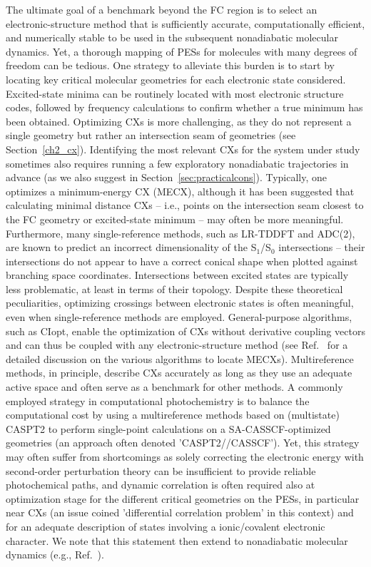 \documentclass[9pt,bestpractices,pubversion]{livecoms}
\begin{document}
The ultimate goal of a benchmark beyond the FC region is to select an electronic-structure method that is sufficiently accurate, computationally efficient, and numerically stable to be used in the subsequent nonadiabatic molecular dynamics. Yet, a thorough mapping of PESs for molecules with many degrees of freedom can be tedious. One strategy to alleviate this burden is to start by locating key critical molecular geometries for each electronic state considered. Excited-state minima can be routinely located with most electronic structure codes, followed by frequency calculations to confirm whether a true minimum has been obtained. Optimizing CXs is more challenging, as they do not represent a single geometry but rather an intersection seam of geometries (see Section~\ref{ch2_cx}).\cite{pieri2021namdreactor} Identifying the most relevant CXs for the system under study sometimes also requires running a few exploratory nonadiabatic trajectories in advance (as we also suggest in Section~\ref{sec:practicalcons}). Typically, one optimizes a minimum-energy CX (MECX), although it has been suggested that calculating minimal distance CXs -- i.e., points on the intersection seam closest to the FC geometry or excited-state minimum -- may often be more meaningful.\cite{levine2008optimizing} Furthermore, many single-reference methods, such as LR-TDDFT and ADC(2), are known to predict an incorrect dimensionality of the S$_1$/S$_0$ intersections -- their intersections do not appear to have a correct conical shape when plotted against branching space coordinates.\cite{tuna2015assessment,taylor2023description} Intersections between excited states are typically less problematic, at least in terms of their topology. Despite these theoretical peculiarities, optimizing crossings between electronic states is often meaningful, even when single-reference methods are employed.\cite{taylor2023description} General-purpose algorithms, such as CIopt,\cite{levine2008optimizing} enable the optimization of CXs without derivative coupling vectors and can thus be coupled with any electronic-structure method (see Ref.~ for a detailed discussion on the various algorithms to locate MECXs). Multireference methods, in principle, describe CXs accurately as long as they use an adequate active space and often serve as a benchmark for other methods. A commonly employed strategy in computational photochemistry is to balance the computational cost by using a multireference methods based on (multistate) CASPT2 to perform single-point calculations on a SA-CASSCF-optimized geometries (an approach often denoted 'CASPT2//CASSCF').\cite{sanjuan2012reviewcasscfpt2,gonzalez2012progress} Yet, this strategy may often suffer from shortcomings as solely correcting the electronic energy with second-order perturbation theory can be insufficient to provide reliable photochemical paths, and dynamic correlation is often required also at optimization stage for the different critical geometries on the PESs, in particular near CXs (an issue coined 'differential correlation problem'\cite{gonzalez2012progress} in this context) and for an adequate description of states involving a ionic/covalent electronic character. We note that this statement then extend to nonadiabatic molecular dynamics (e.g., Ref.~).
\end{document}
